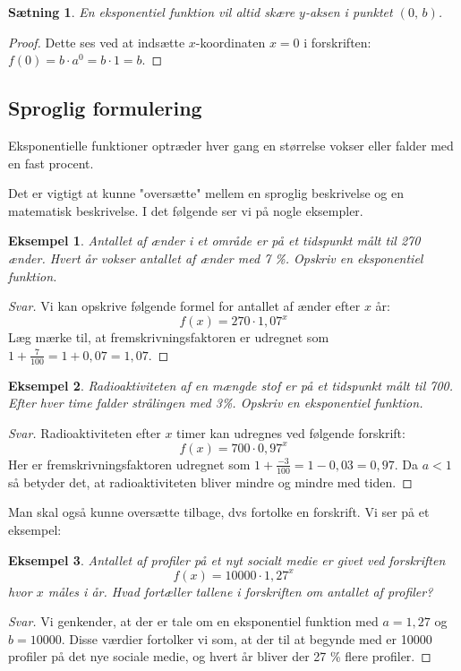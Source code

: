 \documentclass[12pt,oneside,a4paper]{article}
\theoremstyle{plain}
\newtheorem*{thm}{Sætning}
\newtheorem*{eks}{Eksempel}
\begin{document}
\begin{thm}
    En eksponentiel funktion vil altid skære $y$-aksen i punktet $(0,\,b)$.
\end{thm}
\begin{proof}
    Dette ses ved at indsætte $x$-koordinaten $x=0$ i forskriften:
    $f(0) = b\cdot a^0 = b\cdot 1 = b$.
\end{proof}

\subsection*{Sproglig formulering}
Eksponentielle funktioner optræder hver gang en størrelse vokser eller falder
med en fast procent.

Det er vigtigt at kunne "oversætte" mellem en sproglig beskrivelse og en matematisk beskrivelse.
I det følgende ser vi på nogle eksempler.

\begin{eks}
    Antallet af ænder i et område er på et tidspunkt målt til 270 ænder. Hvert
    år vokser antallet af ænder med 7 \%. Opskriv en eksponentiel funktion.
\end{eks}
\begin{proof}[Svar]
    Vi kan opskrive følgende formel for antallet af ænder efter $x$ år:
    $$
    f(x) = 270 \cdot 1,07^x
    $$
    Læg mærke til, at fremskrivningsfaktoren er udregnet som $1+\frac{7}{100} =
    1+0,07 = 1,07$.
\end{proof}

\begin{eks}
    Radioaktiviteten af en mængde stof er på et tidspunkt målt til 700. Efter
    hver time falder strålingen med 3\%. Opskriv en eksponentiel funktion.
\end{eks}
\begin{proof}[Svar]
    Radioaktiviteten efter $x$ timer kan udregnes ved følgende forskrift:
    $$
    f(x) = 700 \cdot 0,97^x
    $$
    Her er fremskrivningsfaktoren udregnet som $1 + \frac{-3}{100} = 1-0,03 = 0,97$.
    Da $a<1$ så betyder det, at radioaktiviteten bliver mindre og mindre med tiden.
\end{proof}

Man skal også kunne oversætte tilbage, dvs fortolke en forskrift. Vi ser på et eksempel:

\begin{eks}
    Antallet af profiler på et nyt socialt medie er givet ved forskriften
    $$
    f(x) = 10000 \cdot 1,27^x
    $$
    hvor $x$ måles i år. Hvad fortæller tallene i forskriften om antallet af
    profiler?
\end{eks}
\begin{proof}[Svar]
    Vi genkender, at der er tale om en eksponentiel funktion med $a=1,27$ og
    $b=10000$.  Disse værdier fortolker vi som, at der til at begynde med er
    10000 profiler på det nye sociale medie, og hvert år bliver der 27 \% flere
    profiler.
\end{proof}
\end{document}
